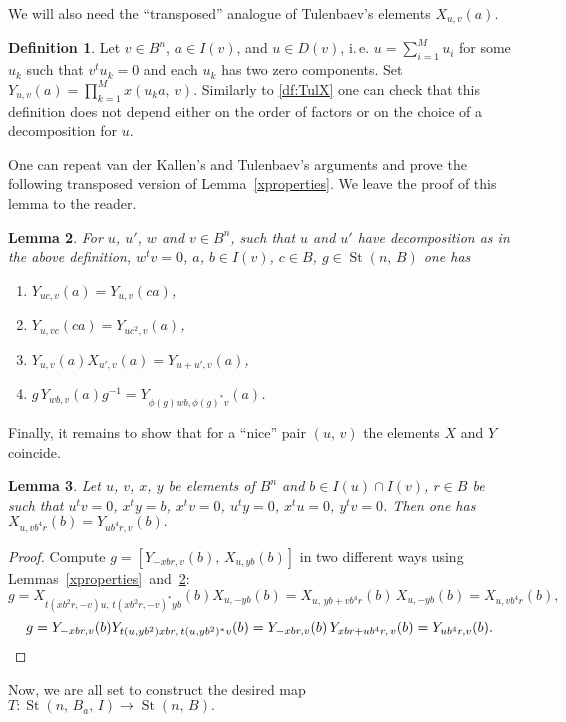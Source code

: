 \documentclass[11pt]{amsart}
\theoremstyle{plain} \declaretheorem[name=Theorem, Refname={Theorem,Theorems}]{tm} \Crefname{tm}{Theorem}{Theorems}
\numberwithin{equation}{section}
\newtheorem{lm}{Lemma} \numberwithin{lm}{section} \Crefname{lm}{Lemma}{Lemmas}
\theoremstyle{definition} \newtheorem{df}[lm]{Definition} \Crefname{df}{Definition}{Definitions}
\theoremstyle{remark} \newtheorem{rk}[lm]{Remark} \Crefname{rk}{Remark}{Remarks}
\newcommand{\St}{\mathop{\mathrm{St}}\nolimits}
\newcommand{\inv}{^{-1}}
\begin{document}
We will also need the ``transposed'' analogue of Tulenbaev's elements $X_{u,v}(a)$.
\begin{df} \label{df:TulY}
Let $v\in B^n$, $a\in I(v)$, and $u \in D(v)$, i.\,e. $u = \sum\limits_{i=1}^M u_i$ for some $u_k$ such that $v^tu_k=0$ and each $u_k$ has two zero components.
Set $Y_{u,v}(a)=\prod_{k=1}^Mx(u_ka,\,v)$. 
Similarly to \ref{df:TulX} one can check that this definition does not depend either on the order of factors or on the choice of a decomposition for $u$.
\end{df}

One can repeat van der Kallen's and Tulenbaev's arguments and prove the following transposed version of Lemma~\ref{xproperties}.
We leave the proof of this lemma to the reader.
\begin{lm}
\label{yproperties}
For $u$, $u'$, $w$ and $v\in B^n$, such that $u$ and $u'$ have decomposition as in the above definition, $w^tv=0$, $a$, $b\in I(v)$, $c\in B$, $g\in\St(n,\,B)$ one has
\begin{enumerate}
\item $Y_{uc,v}(a)=Y_{u,v}(ca)$,
\item $Y_{u,vc}(ca)=Y_{uc^2,v}(a)$,
\item $Y_{u,v}(a)X_{u',v}(a)=Y_{u+u',v}(a)$,
\item $g\,Y_{wb,v}(a)g\inv=Y_{\phi(g)wb,\phi(g)^*v}(a)$.
\end{enumerate}
\end{lm}

Finally, it remains to show that for a ``nice'' pair $(u,\,v)$ the elements $X$ and $Y$ coincide.
\begin{lm}\label{x=y}
Let $u$, $v$, $x$, $y$ be elements of $B^n$ and $b\in I(u)\cap I(v)$, $r\in B$ be such that $u^t v = 0$, $x^ty=b$, $x^tv=0$, $u^ty=0$, $x^tu = 0$, $y^tv=0$.
Then one has $X_{u,vb^4r}(b)=Y_{ub^4r,v}(b).$
\end{lm}
\begin{proof}
Compute $g=[Y_{-xbr,v}(b),\,X_{u,yb}(b)]$ in two different ways using Lemmas~\ref{xproperties}~and~\ref{yproperties}:
$$ g = X_{t(xb^2r,-v)u,\,t(xb^2r,-v)^*yb}(b)X_{u,-yb}(b) = X_{u,\,yb+vb^4r}(b)\, X_{u,-yb}(b) = X_{u,vb^4r}(b),$$
$$ g = Y_{-xbr,v}(b) Y_{t(u,yb^2)xbr,\,t(u,yb^2)^*v}(b)= Y_{-xbr,v}(b)\, Y_{xbr+ub^4r,\,v}(b)=Y_{ub^4r,v}(b).\qedhere$$
\end{proof}

Now, we are all set to construct the desired map $T\colon\St(n,\,B_a,\,I)\rightarrow\St(n,\,B).$
\end{document}
